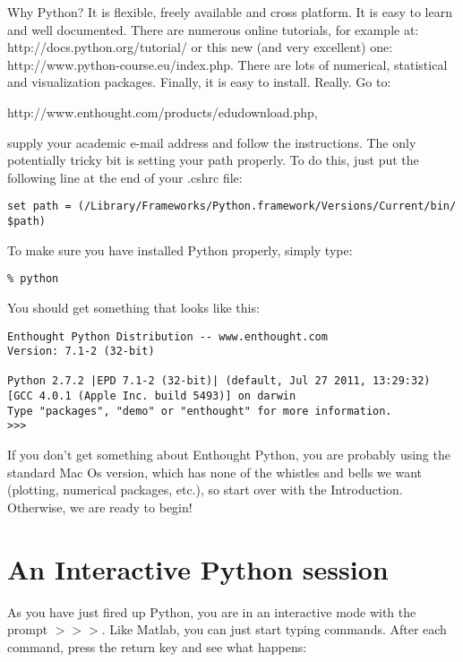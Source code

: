 Why Python?  It is flexible, freely available and cross platform.  It is easy 
 to learn and well documented.   There are numerous online tutorials, for example at: http://docs.python.org/tutorial/ or this new (and very excellent) one: http://www.python-course.eu/index.php.  
There are lots of numerical, statistical and visualization packages.  Finally, it is 
easy to install.  Really.  Go to:  

http://www.enthought.com/products/edudownload.php, 

\noindent
supply your academic e-mail address and follow the instructions.  The only potentially tricky bit is setting your path properly.   To do this, just put the following line at the end of  your .cshrc file:

{\singlespacing \color{blue} \begin{verbatim}
set path = (/Library/Frameworks/Python.framework/Versions/Current/bin/ $path)
\end{verbatim}}

\noindent
To make sure you have installed Python properly, simply type:
{\singlespacing \color{blue} \begin{verbatim}
% python   
\end{verbatim}}
\noindent
You should get something that looks like this:

{\singlespacing \color{blue} \begin{verbatim}
Enthought Python Distribution -- www.enthought.com
Version: 7.1-2 (32-bit)

Python 2.7.2 |EPD 7.1-2 (32-bit)| (default, Jul 27 2011, 13:29:32) 
[GCC 4.0.1 (Apple Inc. build 5493)] on darwin
Type "packages", "demo" or "enthought" for more information.
>>> 
\end{verbatim}   }
\noindent
If you don't get something about Enthought Python, you are probably using the standard Mac Os version, which has none of the whistles and bells we want (plotting, numerical packages, etc.), so start over with the Introduction.    Otherwise, we are ready to begin!

\section{An Interactive Python session}

As you have just fired up Python, you are in an interactive mode with the prompt  {\color{blue}$>>>$}.  Like Matlab, you can just start typing commands. After each command, press the return key and see what happens:

